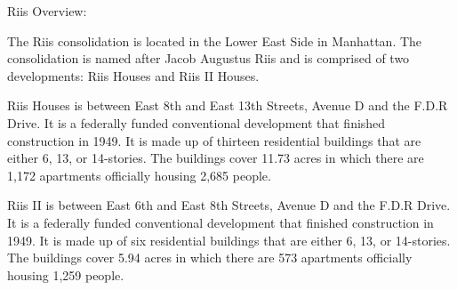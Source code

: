 Riis Overview:

The Riis consolidation is located in the Lower East Side in Manhattan. The consolidation is named after Jacob Augustus Riis and is comprised of two developments: Riis Houses and Riis II Houses.

Riis Houses is between East 8th and East 13th Streets, Avenue D and the F.D.R Drive. It is a federally funded conventional development that finished construction in 1949. It is made up of thirteen residential buildings that are either 6, 13, or 14-stories. The buildings cover 11.73 acres in which there are 1,172 apartments officially housing 2,685 people. 

Riis II is between East 6th and East 8th Streets, Avenue D and the F.D.R Drive. It is a federally funded conventional development that finished construction in 1949. It is made up of six residential buildings that are either 6, 13, or 14-stories. The buildings cover 5.94 acres in which there are 573 apartments officially housing 1,259 people. 